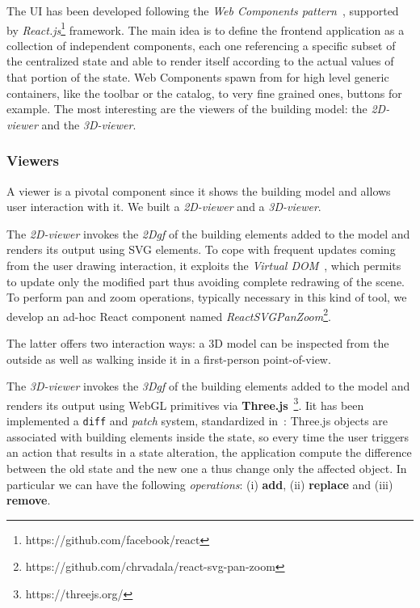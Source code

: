 The UI has been developed following the \emph{Web Components pattern}~\cite{CITARE-QUALCOSA}, supported by \emph{React.js}\footnote{https://github.com/facebook/react} framework. The main idea is to define the frontend application as a collection of independent components, each one referencing a specific subset of the centralized state and able to render itself according to the actual values of that portion of the state. Web Components spawn from for high level generic containers, like the toolbar or the catalog, to very fine grained ones, buttons for example. The most interesting are the viewers of the building model: the \emph{2D-viewer} and the \emph{3D-viewer}.

\subsubsection*{Viewers} A viewer is a pivotal component since it shows the building model and allows user interaction with it. We built a \emph{2D-viewer} and a \emph{3D-viewer}. 

The \emph{2D-viewer} invokes the \emph{2Dgf} of the building elements added to the model and renders its output using SVG elements. To cope with frequent updates coming from the user drawing interaction, it exploits the \emph{Virtual DOM}~\cite{vdom}, which permits to update only the modified part thus avoiding complete redrawing of the scene. To perform pan and zoom operations, typically necessary in this kind of tool, we develop an ad-hoc React component named \emph{ReactSVGPanZoom}\footnote{https://github.com/chrvadala/react-svg-pan-zoom}.



The latter offers two interaction ways: a 3D model can be inspected from the outside as well as walking inside it in a first-person point-of-view.


The \emph{3D-viewer} invokes the \emph{3Dgf} of the building elements added to the model and renders its output using WebGL primitives via \textbf{Three.js}~\footnote{https://threejs.org/}. Iit has been implemented a \texttt{diff} and \textit{patch} system, standardized in~\cite{rfc6902}: Three.js objects are associated with building elements inside the state, so every time the user triggers an action that results in a state alteration, the application compute the difference between the old state and the new one a thus change only the affected object. In particular we can have the following \textit{operations}: (i) \textbf{add}, (ii) \textbf{replace} and (iii) \textbf{remove}.


